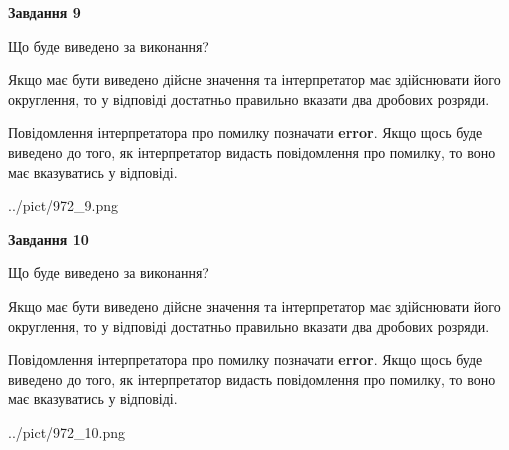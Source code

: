 \documentclass[12pt, ukrainian]{article}
\begin{document}
{\begin {Large}
{\begin {center}\textbf{Завдання 9}\end {center}}\par
Що буде виведено за виконання? \par

Якщо має бути виведено дійсне значення та інтерпретатор має здійснювати його округлення, 
то у відповіді достатньо правильно вказати два дробових розряди.

Повідомлення інтерпретатора про помилку позначати \textbf{error}.
Якщо щось буде виведено до того, як інтерпретатор видасть повідомлення про помилку, 
то воно має вказуватись у відповіді. \par

\begin{center}
	{../pict/972_9.png}
\end{center}
\newpage

{\begin {center}\textbf{Завдання 10}\end {center}}\par
Що буде виведено за виконання? \par

Якщо має бути виведено дійсне значення та інтерпретатор має здійснювати його округлення, 
то у відповіді достатньо правильно вказати два дробових розряди.

Повідомлення інтерпретатора про помилку позначати \textbf{error}.
Якщо щось буде виведено до того, як інтерпретатор видасть повідомлення про помилку, 
то воно має вказуватись у відповіді. \par

\begin{center}
	{../pict/972_10.png}
\end{center}
\newpage

\end {Large}}
\end{document}
